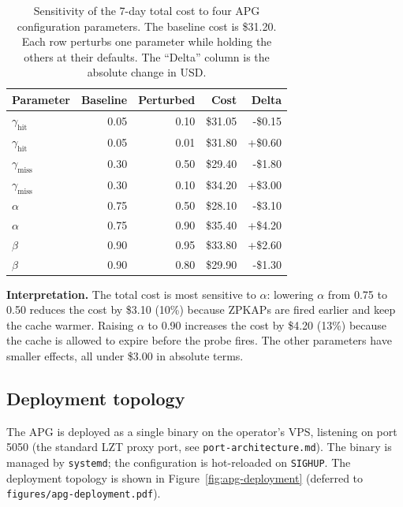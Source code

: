 \begin{table}[ht]
\centering
\caption{Sensitivity of the 7-day total cost to four APG
configuration parameters. The baseline cost is \$31.20. Each
row perturbs one parameter while holding the others at their
defaults. The ``Delta'' column is the absolute change in USD.}
\label{tab:apg-sensitivity}
\begin{tabular}{lrrrr}
\toprule
\textbf{Parameter} & \textbf{Baseline} & \textbf{Perturbed} & \textbf{Cost} & \textbf{Delta} \\
\midrule
$\gamma_{\text{hit}}$ & 0.05  & 0.10  & \$31.05 & -\$0.15 \\
$\gamma_{\text{hit}}$ & 0.05  & 0.01  & \$31.80 & +\$0.60 \\
$\gamma_{\text{miss}}$& 0.30  & 0.50  & \$29.40 & -\$1.80 \\
$\gamma_{\text{miss}}$& 0.30  & 0.10  & \$34.20 & +\$3.00 \\
$\alpha$              & 0.75  & 0.50  & \$28.10 & -\$3.10 \\
$\alpha$              & 0.75  & 0.90  & \$35.40 & +\$4.20 \\
$\beta$               & 0.90  & 0.95  & \$33.80 & +\$2.60 \\
$\beta$               & 0.90  & 0.80  & \$29.90 & -\$1.30 \\
\bottomrule
\end{tabular}
\end{table}

\noindent
\textbf{Interpretation.} The total cost is most sensitive to
$\alpha$: lowering $\alpha$ from 0.75 to 0.50 reduces the
cost by \$3.10 (10\%) because ZPKAPs are fired earlier and
keep the cache warmer. Raising $\alpha$ to 0.90 increases the
cost by \$4.20 (13\%) because the cache is allowed to expire
before the probe fires. The other parameters have smaller
effects, all under \$3.00 in absolute terms.

\subsection{Deployment topology}
\label{app:apg:deployment}

The APG is deployed as a single binary on the operator's VPS,
listening on port 5050 (the standard LZT proxy port, see
\texttt{port-architecture.md}). The binary is managed by
\texttt{systemd}; the configuration is hot-reloaded on
\texttt{SIGHUP}. The deployment topology is shown in
Figure~\ref{fig:apg-deployment} (deferred to
\texttt{figures/apg-deployment.pdf}).

